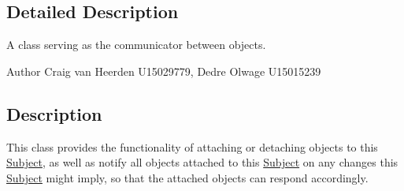 \subsection{\-Detailed \-Description}
\-A class serving as the communicator between objects. 

\begin{DoxyAuthor}{\-Author}
\-Craig van \-Heerden \-U15029779, \-Dedre \-Olwage \-U15015239
\end{DoxyAuthor}
\hypertarget{class_unit_factory_Description}{}\subsection{\-Description}\label{class_unit_factory_Description}
\-This class provides the functionality of attaching or detaching objects to this \hyperlink{class_subject}{\-Subject}, as well as notify all objects attached to this \hyperlink{class_subject}{\-Subject} on any changes this \hyperlink{class_subject}{\-Subject} might imply, so that the attached objects can respond accordingly. 

